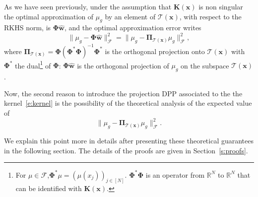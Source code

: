 \documentclass[twoside,11pt]{book}
\numberwithin{theorem}{chapter}
\numberwithin{definition}{chapter}
\numberwithin{proposition}{chapter}
\numberwithin{corollary}{chapter}
\numberwithin{example}{chapter}
\numberwithin{lemma}{chapter}
\begin{document}
 As we have seen previously, under the assumption that $\bm{K}(\bm{x})$ is non singular the optimal approximation of $\mu_{g}$ by an element of $\mathcal{T}(\bm{x})$, with respect to the RKHS norm, is $\bm{\Phi}\hat{\bm{w}}$, and the optimal approximation error writes
\begin{equation}
\|\mu_{g} - \bm{\Phi}\hat{\bm{w}}\|^{2}_{\mathcal{F}} =\|\mu_{g} - \bm{\Pi}_{\mathcal{T}(\bm{x})}\mu_{g}\|^{2}_{\mathcal{F}},\label{e:finalTool}
\end{equation}
where $\bm{\Pi}_{\mathcal{T}(\bm{x})} = \bm{\Phi}(\bm{\Phi}^{*}\bm{\Phi})^{-1}\bm{\Phi}^{*}$ is the orthogonal projection onto $\mathcal{T}(\bm{x})$ with $\bm{\Phi}^{*}$ the dual\footnote{For $\mu \in \mathcal{F}$,$\bm{\Phi}^{*}\mu = (\mu(x_{j}))_{j \in [N]}$. $\bm{\Phi}^{*}\bm{\Phi}$ is an operator from $\mathbb{R}^{N}$ to $\mathbb{R}^{N}$ that can be identified with $\bm{K}(\bm{x})$.} of $\bm{\Phi}$: $\bm{\Phi}\hat{\bm{w}}$ is the orthogonal projection of $\mu_{g}$ on the subspace $\mathcal{T}(\bm{x})$. 


Now, the second reason to introduce the projection DPP associated to the the kernel~\eqref{e:kernel} is the possibility of the theoretical analysis of the expected value of 
 \begin{equation}
 \|\mu_{g} - \bm{\Pi}_{\mathcal{T}(\bm{x})} \mu_{g}\|_{\mathcal{F}}^{2}.
 \end{equation}



We explain this point more in details after presenting these theoretical guarantees in the following section. The details of the proofs are given in Section~\ref{s:proofs}.
\end{document}
